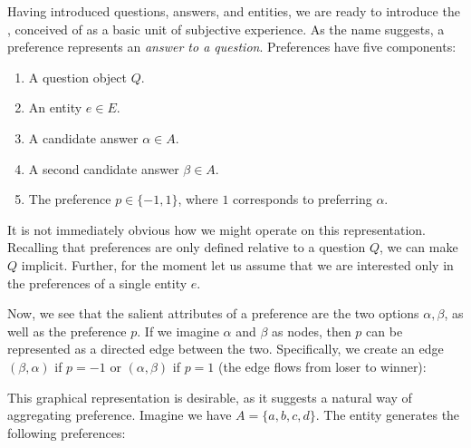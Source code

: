 \bigskip

Having introduced questions, answers, and entities, we are ready to introduce the , conceived of as a basic unit of subjective experience. As the name suggests, a preference represents an \textit{answer to a question}. Preferences have five components:

\begin{enumerate}
	\item A question object $Q$.
	\item An entity $e \in E$.
	\item A candidate answer $\alpha \in A$.
	\item A second candidate answer $\beta \in A$.
	\item The preference $p \in \{-1, 1\}$, where $1$ corresponds to preferring $\alpha$.
\end{enumerate}

It is not immediately obvious how we might operate on this representation. Recalling that preferences are only defined relative to a question $Q$, we can make $Q$ implicit. Further, for the moment let us assume that we are interested only in the preferences of a single entity $e$.

Now, we see that the salient attributes of a preference are the two options $\alpha, \beta$, as well as the preference $p$. If we imagine $\alpha$ and $\beta$ as nodes, then $p$ can be represented as a directed edge between the two. Specifically, we create an edge $(\beta, \alpha)$ if $p = -1$ or $(\alpha, \beta)$ if $p = 1$ (the edge flows from loser to winner):

\begin{center}
\end{center}

This graphical representation is desirable, as it suggests a natural way of aggregating preference. Imagine we have $A = \{a, b, c, d\}$. The entity generates the following preferences:

\begin{center}





\end{center}

